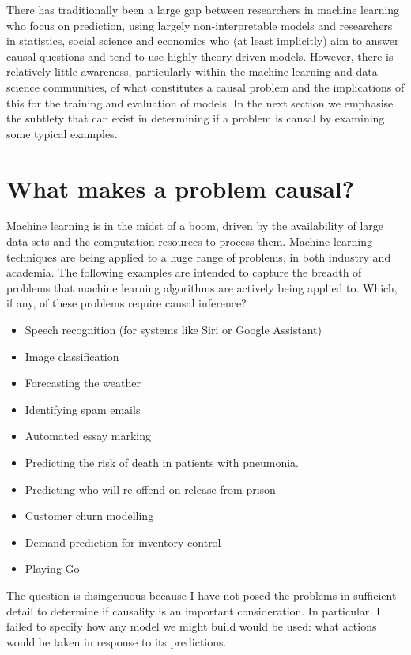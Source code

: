\documentclass[11pt,a4paper,twoside]{report}
\theoremstyle{plain}
\theoremstyle{definition}
\begin{document}
There has traditionally been a large gap between researchers in machine learning who focus on prediction, using largely non-interpretable models and researchers in statistics, social science and economics who (at least implicitly) aim to answer causal questions and tend to use highly theory-driven models. However, there is relatively little awareness, particularly within the machine learning and data science communities, of what constitutes a causal problem and the implications of this for the training and evaluation of models. In the next section we emphasise the subtlety that can exist in determining if a problem is causal by examining some typical examples. 

\section{What makes a problem causal?}

Machine learning is in the midst of a boom, driven by the availability of large data sets and the computation resources to process them. Machine learning techniques are being applied to a huge range of problems, in both industry and academia. The following examples are intended to capture the breadth of problems that machine learning algorithms are actively being applied to. Which, if any, of these problems require causal inference? 

\begin{itemize}
\item Speech recognition (for systems like Siri or Google Assistant)
\item Image classification
\item Forecasting the weather
\item Identifying spam emails
\item Automated essay marking
\item Predicting the risk of death in patients with pneumonia.
\item Predicting who will re-offend on release from prison 
\item Customer churn modelling
\item Demand prediction for inventory control
\item Playing Go 
\end{itemize}

The question is disingenuous because I have not posed the problems in sufficient detail to determine if causality is an important consideration. In particular, I failed to specify how any model we might build would be used: what actions would be taken in response to its predictions. 
\end{document}

